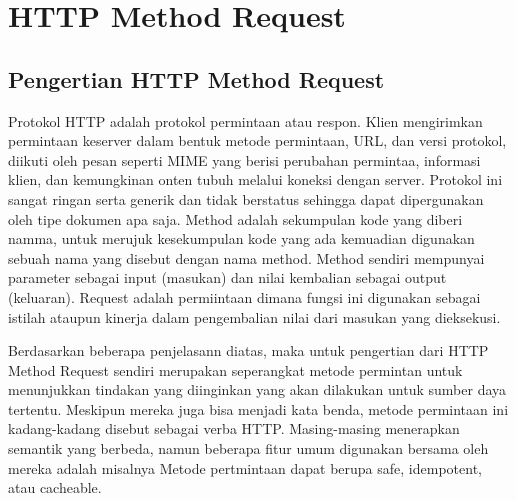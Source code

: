 \section{HTTP Method Request}
\subsection{Pengertian HTTP Method Request}
Protokol HTTP adalah protokol permintaan atau respon. Klien mengirimkan permintaan keserver dalam bentuk metode permintaan, URL, dan versi protokol, diikuti oleh pesan seperti MIME yang berisi perubahan permintaa, informasi klien, dan kemungkinan onten tubuh melalui koneksi dengan server\cite{wyler2005aggressive}. Protokol ini sangat ringan serta generik dan tidak berstatus sehingga dapat dipergunakan oleh tipe dokumen apa saja. Method adalah sekumpulan kode yang diberi namma, untuk merujuk kesekumpulan kode yang ada kemuadian digunakan sebuah nama yang disebut dengan nama method. Method sendiri mempunyai parameter sebagai input (masukan) dan nilai kembalian sebagai output (keluaran). Request adalah permiintaan dimana fungsi ini digunakan sebagai istilah ataupun kinerja dalam pengembalian nilai dari masukan yang dieksekusi.

Berdasarkan beberapa penjelasann diatas, maka untuk pengertian dari HTTP Method Request sendiri merupakan seperangkat metode permintan untuk menunjukkan tindakan yang diinginkan yang akan dilakukan untuk sumber daya tertentu. Meskipun mereka juga bisa menjadi kata benda, metode permintaan ini kadang-kadang disebut sebagai verba HTTP. Masing-masing menerapkan semantik yang berbeda, namun beberapa fitur umum digunakan bersama oleh mereka adalah misalnya Metode pertmintaan dapat berupa safe, idempotent, atau cacheable.

